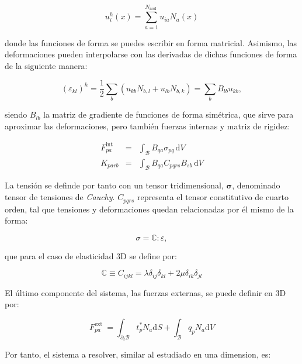 \begin{equation}
u_{i}^{h}(x)=\sum_{a=1}^{N_{\text {nod }}} u_{i a} N_{a}(x)
\end{equation}

donde las funciones de forma se puedes escribir en forma matricial. Asimismo, las deformaciones pueden interpolarse con las derivadas de dichas funciones de forma de la siguiente manera:

\begin{equation}
\left(\varepsilon_{k l}\right)^{h}=\frac{1}{2} \sum_{b}\left(u_{k b} N_{b, l}+u_{l b} N_{b, k}\right)=\sum_{b} B_{l b} u_{k b},
\end{equation}

siendo $B_{l b}$ la matriz de gradiente de funciones de forma simétrica, que sirve para aproximar las deformaciones, pero también fuerzas internas y matriz de rigidez:

\begin{eqnarray}
F_{p a}^{\text {int }} &=& \int_{\mathcal{B}} B_{q a} \sigma_{p q} \, \mathrm{d} V \\
K_{p a r b}&=& \int_{\mathcal{B}} B_{q a} C_{p q r s} B_{s b} \,\mathrm{d} V
\end{eqnarray}

La tensión se definde por tanto con un tensor tridimensional, $\bm{\sigma}$, denominado tensor de tensiones de \textit{Cauchy}. $C_{p q r s}$ representa el tensor constitutivo de cuarto orden, tal que tensiones y deformaciones quedan relacionadas por él mismo de la forma:

\begin{equation}
\sigma=\mathbb{C}: \varepsilon,
\end{equation}

que para el caso de elasticidad 3D se define por:

\begin{equation}
\mathbb{C} \equiv C_{i j k l}=\lambda \delta_{i j} \delta_{k l}+2 \mu \delta_{i k} \delta_{j l}
\end{equation}

El último componente del sistema, las fuerzas externas, se puede definir en 3D por:

\begin{equation}
F_{p a}^{\text {ext }} = \int_{\partial_{t} \mathcal{B}} t_{p}^{*} N_{a} \mathrm{d} S+\int_{\mathcal{B}} q_{p} N_{a} \mathrm{d} V
\end{equation}

Por tanto, el sistema a resolver, similar al estudiado en una dimension, es:

